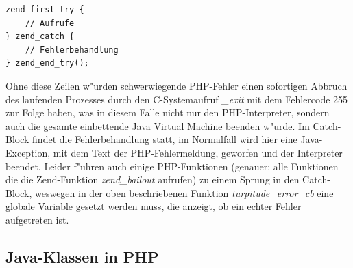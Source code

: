 \begin{lstlisting}[caption=Zend Try-Catch Block]
zend_first_try {
    // Aufrufe
} zend_catch {
    // Fehlerbehandlung
} zend_end_try();
\end{lstlisting}
Ohne diese Zeilen w"urden schwerwiegende PHP-Fehler einen sofortigen Abbruch des laufenden Prozesses durch den C-Systemaufruf
\emph{\_exit} mit dem Fehlercode 255 zur Folge haben, was in diesem Falle nicht nur den PHP-Interpreter, sondern auch die gesamte 
einbettende Java Virtual Machine beenden w"urde. Im Catch-Block findet die Fehlerbehandlung statt, im Normalfall wird hier eine
Java-Exception, mit dem Text der PHP-Fehlermeldung, geworfen und der Interpreter beendet. Leider f"uhren auch einige PHP-Funktionen
(genauer: alle Funktionen die die Zend-Funktion \emph{zend\_bailout} aufrufen)
zu einem Sprung in den Catch-Block, weswegen in der oben beschriebenen Funktion \emph{turpitude\_error\_cb} eine globale Variable
gesetzt werden muss, die anzeigt, ob ein echter Fehler aufgetreten ist.

\subsection{Java-Klassen in PHP}
\label{sec:chap1:impl:4}

